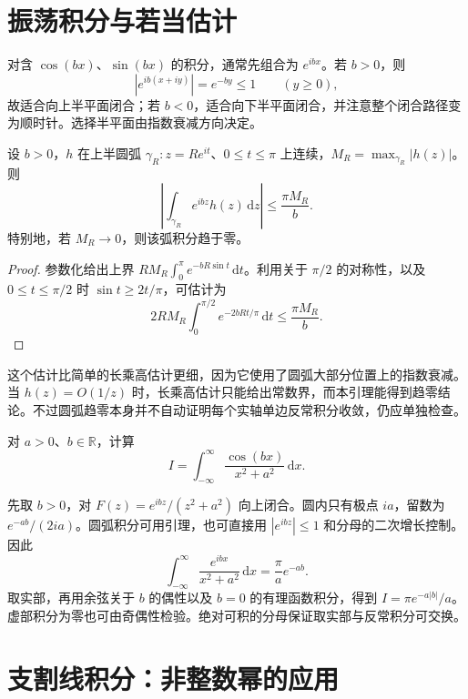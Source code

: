 \section{振荡积分与若当估计}

对含 $\cos(bx)$、$\sin(bx)$ 的积分，通常先组合为 $e^{ibx}$。若 $b>0$，则
\[
 |e^{ib(x+iy)}|=e^{-by}\le1\qquad(y\ge0),
\]
故适合向上半平面闭合；若 $b<0$，适合向下半平面闭合，并注意整个闭合路径变为顺时针。选择半平面由指数衰减方向决定。

\begin{lemma}[若当圆弧估计]
\label{lem:ca-jordan}
设 $b>0$，$h$ 在上半圆弧 $\gamma_R:z=Re^{it}$、$0\le t\le\pi$ 上连续，$M_R=\max_{\gamma_R}|h(z)|$。则
\[
 \left|\int_{\gamma_R}e^{ibz}h(z)\,\mathrm dz\right|
 \le\frac{\pi M_R}{b}.
\]
特别地，若 $M_R\to0$，则该弧积分趋于零。
\end{lemma}
\begin{proof}
参数化给出上界 $RM_R\int_0^\pi e^{-bR\sin t}\,\mathrm dt$。利用关于 $\pi/2$ 的对称性，以及 $0\le t\le\pi/2$ 时 $\sin t\ge2t/\pi$，可估计为
\[
 2RM_R\int_0^{\pi/2}e^{-2bRt/\pi}\,\mathrm dt
 \le\frac{\pi M_R}{b}.
\]
\end{proof}

这个估计比简单的长乘高估计更细，因为它使用了圆弧大部分位置上的指数衰减。当 $h(z)=O(1/z)$ 时，长乘高估计只能给出常数界，而本引理能得到趋零结论。不过圆弧趋零本身并不自动证明每个实轴单边反常积分收敛，仍应单独检查。

\begin{example}[余弦变换型积分]
对 $a>0$、$b\in\mathbb R$，计算
\[
 I=\int_{-\infty}^{\infty}\frac{\cos(bx)}{x^2+a^2}\,\mathrm dx.
\]
\end{example}
\begin{solve}
先取 $b>0$，对 $F(z)=e^{ibz}/(z^2+a^2)$ 向上闭合。圆内只有极点 $ia$，留数为 $e^{-ab}/(2ia)$。圆弧积分可用引理，也可直接用 $|e^{ibz}|\le1$ 和分母的二次增长控制。因此
\[
 \int_{-\infty}^{\infty}\frac{e^{ibx}}{x^2+a^2}\,\mathrm dx
 =\frac\pi a e^{-ab}.
\]
取实部，再用余弦关于 $b$ 的偶性以及 $b=0$ 的有理函数积分，得到 $I=\pi e^{-a|b|}/a$。虚部积分为零也可由奇偶性检验。绝对可积的分母保证取实部与反常积分可交换。
\end{solve}

\section{支割线积分：非整数幂的应用}

